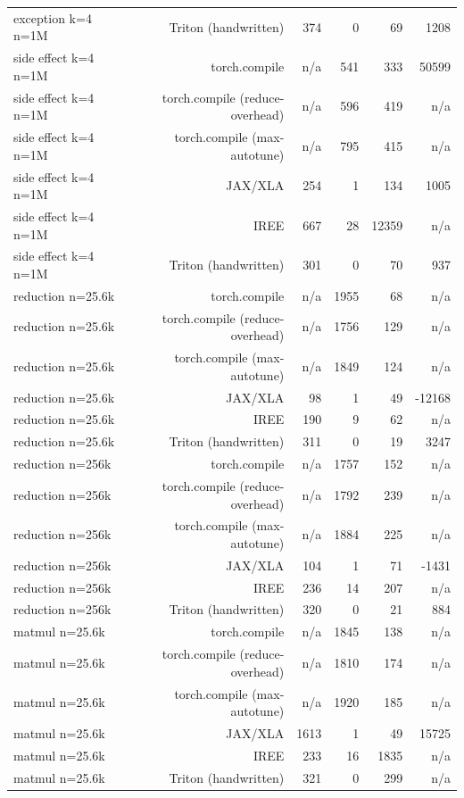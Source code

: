 \begin{tabular}{lrrrrr}
exception k=4 n=1M & Triton (handwritten) & 374 & 0 & 69 & 1208 \\
side effect k=4 n=1M & torch.compile & n/a & 541 & 333 & 50599 \\
side effect k=4 n=1M & torch.compile (reduce-overhead) & n/a & 596 & 419 & n/a \\
side effect k=4 n=1M & torch.compile (max-autotune) & n/a & 795 & 415 & n/a \\
side effect k=4 n=1M & JAX/XLA & 254 & 1 & 134 & 1005 \\
side effect k=4 n=1M & IREE & 667 & 28 & 12359 & n/a \\
side effect k=4 n=1M & Triton (handwritten) & 301 & 0 & 70 & 937 \\
reduction n=25.6k & torch.compile & n/a & 1955 & 68 & n/a \\
reduction n=25.6k & torch.compile (reduce-overhead) & n/a & 1756 & 129 & n/a \\
reduction n=25.6k & torch.compile (max-autotune) & n/a & 1849 & 124 & n/a \\
reduction n=25.6k & JAX/XLA & 98 & 1 & 49 & -12168 \\
reduction n=25.6k & IREE & 190 & 9 & 62 & n/a \\
reduction n=25.6k & Triton (handwritten) & 311 & 0 & 19 & 3247 \\
reduction n=256k & torch.compile & n/a & 1757 & 152 & n/a \\
reduction n=256k & torch.compile (reduce-overhead) & n/a & 1792 & 239 & n/a \\
reduction n=256k & torch.compile (max-autotune) & n/a & 1884 & 225 & n/a \\
reduction n=256k & JAX/XLA & 104 & 1 & 71 & -1431 \\
reduction n=256k & IREE & 236 & 14 & 207 & n/a \\
reduction n=256k & Triton (handwritten) & 320 & 0 & 21 & 884 \\
matmul n=25.6k & torch.compile & n/a & 1845 & 138 & n/a \\
matmul n=25.6k & torch.compile (reduce-overhead) & n/a & 1810 & 174 & n/a \\
matmul n=25.6k & torch.compile (max-autotune) & n/a & 1920 & 185 & n/a \\
matmul n=25.6k & JAX/XLA & 1613 & 1 & 49 & 15725 \\
matmul n=25.6k & IREE & 233 & 16 & 1835 & n/a \\
matmul n=25.6k & Triton (handwritten) & 321 & 0 & 299 & n/a \\

\end{tabular}
